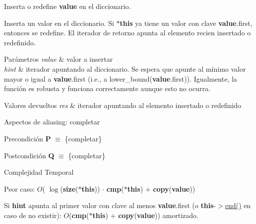 Inserta o redefine {\bfseries value} en el diccionario. 

Inserta un valor en el diccionario. Si {\bfseries $\ast$this} ya tiene un valor con clave {\bfseries value}.first, entonces se redefine. El iterador de retorno apunta al elemento recien insertado o redefinido.


\begin{DoxyParams}{Parámetros}
{\em value} & valor a insertar \\
\hline
{\em hint} & iterador apuntando al diccionario. Se espera que apunte al mínimo valor mayor o igual a {\bfseries value}.first (i.\+e., a lower\+\_\+bound({\bfseries value}.first)). Igualmente, la función es robusta y funciona correctamente aunque esto no ocurra. \\
\hline
\end{DoxyParams}

\begin{DoxyRetVals}{Valores devueltos}
{\em res} & iterador apuntando al elemento insertado o redefinido\\
\hline
\end{DoxyRetVals}
\begin{DoxyParagraph}{Aspectos de aliasing\+:}
completar
\end{DoxyParagraph}
\begin{DoxyPrecond}{Precondición}
{\bfseries P} $\equiv$ \{completar\} 
\end{DoxyPrecond}
\begin{DoxyPostcond}{Postcondición}
{\bfseries Q} $\equiv$ \{completar\}
\end{DoxyPostcond}

\begin{DoxyDescription}
\item[Complejidad Temporal]
\begin{DoxyItemize}
\item Peor caso\+: $O$( $\log$({\bfseries size}({\bfseries $\ast$this})) $\cdot$ {\bfseries cmp}({\bfseries $\ast$this}) $+$ {\bfseries copy}({\bfseries value}))
\item Si {\bfseries hint} apunta al primer valor con clave al menos {\bfseries value}.first (o {\bfseries this}-\/$>$\hyperlink{classaed2_1_1map_a76023e6a56cb625513e1b5ea028bf983_a76023e6a56cb625513e1b5ea028bf983}{end()} en caso de no existir)\+: $O$({\bfseries cmp}({\bfseries $\ast$this}) $+$ {\bfseries copy}({\bfseries value})) amortizado. 
\end{DoxyItemize}
\end{DoxyDescription}

